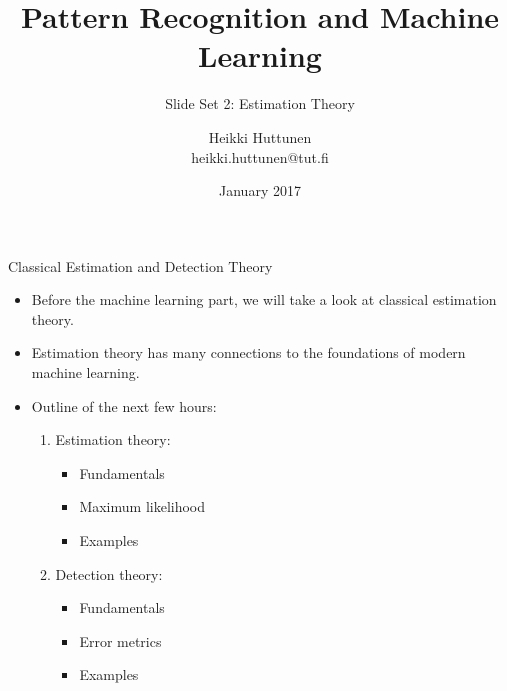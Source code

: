 \documentclass[10pt, aspectratio=169]{beamer} %
\title{Pattern Recognition and Machine Learning}
\subtitle{Slide Set 2: Estimation Theory}
\author{Heikki Huttunen\\
heikki.huttunen@tut.fi}
\institute{Department of Signal Processing\\Tampere University of Technology}
\date{January 2017}
\begin{document}
\maketitle


\lstset{language=Python,style=mystyle} 

\begin{frame}{Classical Estimation and Detection Theory}
\begin{itemize}
\item Before the machine learning part, we will take a look at classical estimation
theory.
\item Estimation theory has many connections to the foundations of modern machine learning.
\item Outline of the next few hours:
\begin{enumerate}
\item Estimation theory: 
\begin{itemize}
\item Fundamentals
\item Maximum likelihood
\item Examples
\end{itemize}
\item Detection theory:
\begin{itemize}
\item Fundamentals
\item Error metrics
\item Examples
\end{itemize}
\end{enumerate}
\end{itemize}
\end{frame}
\end{document}
